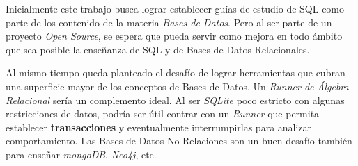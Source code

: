 
Inicialmente este trabajo busca lograr establecer guías de
estudio de SQL como parte de los contenido de la materia \textit{Bases de Datos}.
Pero al ser parte de un proyecto \textit{Open Source}, se espera
que pueda servir como mejora en todo ámbito que sea posible
la enseñanza de SQL y de Bases de Datos Relacionales.

Al mismo tiempo queda planteado el desafío de lograr
herramientas que cubran una superficie mayor de los conceptos
de Bases de Datos. Un \textit{Runner de Álgebra Relacional}
sería un complemento ideal. Al ser \textit{SQLite} poco
estricto con algunas restricciones de datos, podría
ser útil contrar con un \textit{Runner} que permita
establecer \textbf{transacciones} y eventualmente interrumpirlas
para analizar comportamiento.
Las Bases de Datos No Relaciones son un buen desafío
también para enseñar \textit{mongoDB}, \textit{Neo4j}, etc.

